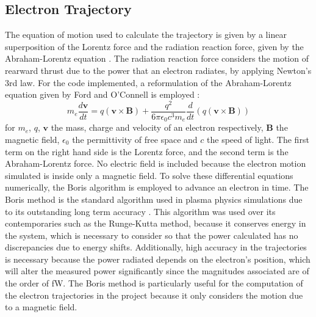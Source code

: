 \documentclass[a4paper,12pt, notitlepage]{article}
\begin{document}
\subsection{Electron Trajectory}
The equation of motion used to calculate the trajectory is given by a linear superposition of the Lorentz force and the radiation reaction force, given by the Abraham-Lorentz equation \cite{Griffiths.2009}. The radiation reaction force considers the motion of rearward thrust due to the power that an electron radiates, by applying Newton's 3rd law. For the code implemented, a reformulation of the Abraham-Lorentz equation given by Ford and O'Connell is employed \cite{Ford1991}:
\begin{equation}
    m_{e}\dfrac{d\boldsymbol{v}}{dt} = q(\boldsymbol{v}\times\boldsymbol{B}) + \dfrac{q^{2}}{6\pi\epsilon_{0}c^{3}m_{e}}\dfrac{d}{dt}\left(q(\boldsymbol{v}\times\boldsymbol{B})\right)
\end{equation}
for $m_{e}$, $q$, $\boldsymbol{v}$ the mass, charge and velocity of an electron respectively, $\boldsymbol{B}$ the magnetic field, $\epsilon_{0}$ the permittivity of free space and $c$ the speed of light. The first term on the right hand side is the Lorentz force, and the second term is the Abraham-Lorentz force. No electric field is included because the electron motion simulated is inside only a magnetic field. To solve these differential equations numerically, the Boris algorithm \cite{Boris1970} is employed to advance an electron in time.
The Boris method is the standard algorithm used in plasma physics simulations due to its outstanding long term accuracy \cite{Hong2013}. This algorithm was used over its contemporaries such as the Runge-Kutta method, because it conserves energy in the system, which is necessary to consider so that the power calculated has no discrepancies due to energy shifts. Additionally, high accuracy in the trajectories is necessary because the power radiated depends on the electron's position, which will alter the measured power significantly since the magnitudes associated are of the order of fW. The Boris method is particularly useful for the computation of the electron trajectories in the project because it only considers the motion due to a magnetic field.
\end{document}
